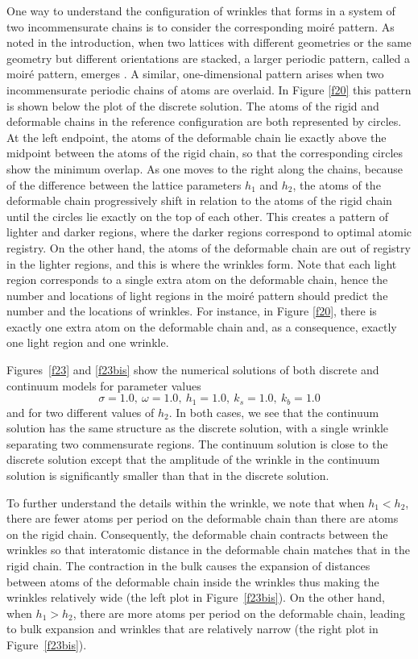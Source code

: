\documentclass{siamltex}
\begin{document}
{One way to understand the configuration of wrinkles that forms in a system of two incommensurate chains is to consider the corresponding moir\'e pattern. As noted in the introduction, when two lattices with different geometries or the same geometry but different orientations are stacked, a larger periodic pattern, called a moir\'e
pattern, emerges \cite{van2015relaxation,van2014moire}. A similar,
one-dimensional pattern arises when two incommensurate periodic chains
of atoms are overlaid. In Figure \ref{f20} this pattern is shown below
the plot of the discrete solution. The atoms of the rigid and deformable chains in the reference configuration are both represented by circles. At the left endpoint, the atoms of the deformable chain lie exactly above the midpoint between the atoms of the rigid chain, so that the corresponding circles show the minimum overlap. As one moves to the right along the chains, because of the difference between the lattice parameters $h_1$ and $h_2$, the atoms of the deformable chain progressively shift in relation to the atoms of the rigid chain until the circles lie exactly on the top of each other. This creates a pattern of lighter and darker regions, where the darker regions correspond to optimal atomic registry. On the other hand, the atoms of the deformable chain are out of registry in the lighter regions, and this is where the wrinkles form. Note that each light region corresponds to a single extra atom on the deformable chain, hence the number and locations of light regions in the moir\'e pattern should predict the number and the locations of wrinkles.  For instance, in Figure \ref{f20}, there is exactly one extra atom on the deformable chain and, as a consequence, exactly one light region and one wrinkle.}

{Figures~\ref{f23} and \ref{f23bis} show the numerical solutions of
both discrete and continuum models for parameter values 
\begin{equation}
\label{eq:comp}
\sigma=1.0,\ \omega=1.0,\ h_{1}=1.0,\ k_s=1.0,\ k_b=1.0
\end{equation}
and for two different values of $h_2$.  In both cases, we see that the continuum solution has the same structure as the discrete solution, with a single wrinkle separating two commensurate regions. The continuum solution is close to the discrete solution except that the amplitude of the wrinkle in the continuum solution is significantly smaller than that in the discrete solution.}

{To further understand the details within the wrinkle, we note that
when $h_1<h_2$, there are fewer atoms per period on the deformable
chain than there are atoms on the rigid chain. Consequently, the
deformable chain contracts between the wrinkles so that interatomic
distance in the deformable chain matches that in the rigid chain. The
contraction in the bulk causes the expansion of distances between
atoms of the deformable chain inside the wrinkles thus making the
wrinkles relatively wide (the left plot in Figure~\ref{f23bis}).
On the other hand, when $h_1>h_2$, there are more atoms per period on
the deformable chain, leading to bulk expansion
and wrinkles that are relatively narrow  (the right plot in Figure~\ref{f23bis}).}
\end{document}
